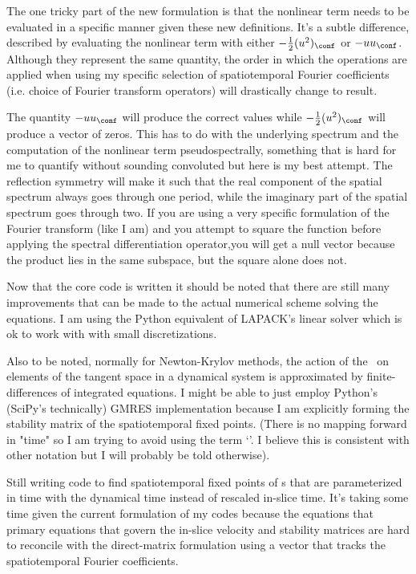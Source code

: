 The one tricky part of the new formulation is that the nonlinear term needs to be evaluated in a specific
manner given these new definitions. It's a subtle difference, described by evaluating the nonlinear term
with either $-\frac{1}{2}(u^2)_\conf$ or $-u u_\conf$. Although they represent the same quantity, the order
in which the operations are applied when using my specific selection of spatiotemporal Fourier coefficients
(i.e. choice of Fourier transform operators) will drastically change to result.

The quantity $-u u_\conf$ will produce the correct values while $-\frac{1}{2}(u^2)_\conf$ will produce a vector
of zeros. This has to do with the underlying spectrum and the computation of the nonlinear term pseudospectrally,
something that is hard for me to quantify without sounding convoluted but here is my best attempt. The reflection
symmetry will make it such that the real component of the spatial spectrum always goes through one period, while
the imaginary part of the spatial spectrum goes through two. If you are using a very specific formulation of
the Fourier transform (like I am) and you attempt to square the function before applying the spectral differentiation
operator,you will get a null vector because the product lies in the same subspace, but the square alone does not.

Now that the core code is written it should be noted that there are still many improvements that can
be made to the actual numerical scheme solving the equations. I am using the Python equivalent of LAPACK's linear
solver which is ok to work with with small discretizations.

Also to be noted, normally for Newton-Krylov methods, the action of the \jacobianM\ on elements of the tangent
space in a dynamical system is approximated by finite-differences of integrated equations. I might be
able to just employ Python's (SciPy's technically) GMRES implementation because I am explicitly forming the
stability matrix of the spatiotemporal fixed points. (There is no mapping forward in "time" so I am trying to avoid
using the term `\jacobianM'. I believe this is consistent with other  notation but I will probably
be told otherwise).

Still writing code to find spatiotemporal fixed points of {\rpo}s that are parameterized
in time with the dynamical time instead of rescaled in-slice time. It's taking some time
given the current formulation of my codes because the equations that primary equations
that govern the in-slice velocity and stability matrices are hard to reconcile with the
direct-matrix formulation using a vector that tracks the spatiotemporal Fourier coefficients.

